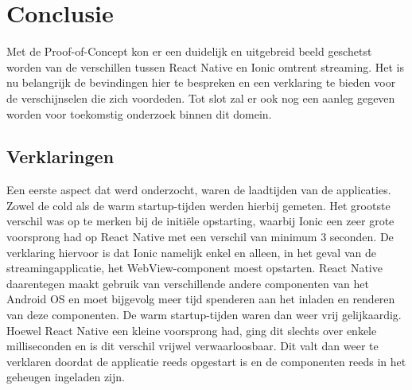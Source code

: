 
\chapter{Conclusie}%
\label{ch:conclusie}


Met de Proof-of-Concept kon er een duidelijk en uitgebreid beeld geschetst worden van de verschillen tussen React Native en Ionic omtrent streaming. Het is nu belangrijk de bevindingen hier te bespreken en een verklaring te bieden voor de verschijnselen die zich voordeden. Tot slot zal er ook nog een aanleg gegeven worden voor toekomstig onderzoek binnen dit domein.

\section{Verklaringen}
\label{sec:verklaringen}

Een eerste aspect dat werd onderzocht, waren de laadtijden van de applicaties. Zowel de cold als de warm startup-tijden werden hierbij gemeten. Het grootste verschil was op te merken bij de initiële opstarting, waarbij Ionic een zeer grote voorsprong had op React Native met een verschil van minimum 3 seconden. De verklaring hiervoor is dat Ionic namelijk enkel en alleen, in het geval van de streamingapplicatie, het WebView-component moest opstarten. React Native daarentegen maakt gebruik van verschillende andere componenten van het Android OS en moet bijgevolg meer tijd spenderen aan het inladen en renderen van deze componenten. De warm startup-tijden waren dan weer vrij gelijkaardig. Hoewel React Native een kleine voorsprong had, ging dit slechts over enkele milliseconden en is dit verschil vrijwel verwaarloosbaar. Dit valt dan weer te verklaren doordat de applicatie reeds opgestart is en de componenten reeds in het geheugen ingeladen zijn.

